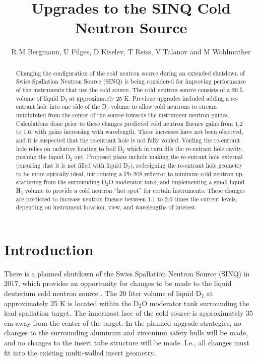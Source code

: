 \documentclass[a4paper]{jpconf}
\begin{document}
\title{Upgrades to the SINQ Cold Neutron Source}

\author{R M Bergmann, U Filges, D Kiselev, T Reiss, V Talanov and M Wohlmuther}

\address{Paul Scherrer Institut, 5232 Villigen, Switzerland}


\begin{abstract}Changing the configuration of the cold neutron source during an extended shutdown of Swiss Spallation Neutron Source (SINQ) is being considered for improving performance of the instruments that use the cold source.  The cold neutron source consists of a 20 L volume of liquid D$_2$ at approximately 25 K.  Previous upgrades included adding a re-entrant hole into one side of the D$_2$ volume to allow cold neutrons to stream uninhibited from the center of the source towards the instrument neutron guides.  Calculations done prior to these changes predicted cold neutron fluence gains from 1.2 to 1.6, with gains increasing with wavelength. These increases have not been observed, and it is suspected that the re-entrant hole is not fully voided.  Voiding the re-entrant hole relies on radiative heating to boil D$_2$ which in turn fills the re-entrant hole cavity, pushing the liquid D$_2$ out.  Proposed plans include making the re-entrant hole external (ensuring that it is not filled with liquid D$_2$), redesigning the re-entrant hole geometry to be more optically ideal, introducing a Pb-208 reflector to minimize cold neutron up-scattering from the surrounding D$_2$O moderator tank, and implementing a small liquid H$_2$ volume to provide a cold neutron “hot spot” for certain instruments.  These changes are predicted to increase neutron fluence between 1.1 to 2.0 times the current levels, depending on instrument location, view, and wavelengths of interest.
\end{abstract}


\section{Introduction}

There is a planned shutdown of the Swiss Spallation Neutron Source (SINQ) in 2017, which provides an opportunity for changes to be made to the liquid deuterium cold neutron source \cite{rueegg_icans}.  The 20 liter volume of liquid D$_2$ at approximately 25 K is located within the D$_2$O moderator tank surrounding the lead spallation target.  The innermost face of the cold source is approximately 35 cm away from the center of the target.  In the planned upgrade strategies, no changes to the surrounding aluminum and zirconium safety hulls will be made, and no changes to the insert tube structure will be made.  I.e., all changes must fit into the existing multi-walled insert geometry.  
\end{document}
